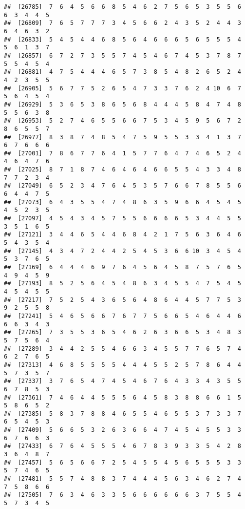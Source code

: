 \documentclass[
]{book}
\begin{document}
\begin{verbatim}
##  [26785]  7  6  4  5  6  6  8  5  4  6  2  7  5  6  5  3  5  5  6  6  3  4  4  5
##  [26809]  7  6  5  7  7  7  3  4  5  6  6  2  4  3  5  2  4  4  3  6  4  6  3  2
##  [26833]  5  4  5  4  4  6  8  5  6  4  6  6  6  5  6  5  5  5  4  5  6  1  3  7
##  [26857]  6  7  2  7  3  5  5  7  4  5  4  6  7  4  5  3  7  8  7  5  5  4  5  4
##  [26881]  4  7  5  4  4  4  6  5  7  3  8  5  4  8  2  6  5  2  4  4  2  3  5  5
##  [26905]  5  6  7  7  5  2  6  5  4  7  3  3  7  6  2  4 10  6  7  5  6  4  5  4
##  [26929]  5  3  6  5  3  8  6  5  6  8  4  4  4  5  8  4  7  4  8  5  5  6  3  8
##  [26953]  5  2  7  4  6  5  5  6  6  7  5  3  4  5  9  5  6  7  2  8  6  5  5  7
##  [26977]  8  3  8  7  4  8  5  4  7  5  9  5  5  3  3  4  1  3  7  6  7  6  6  6
##  [27001]  7  8  6  7  7  6  4  1  5  7  7  6  4  7  4  6  5  2  4  4  6  4  7  6
##  [27025]  8  7  1  8  7  4  6  4  6  4  6  6  5  5  4  3  3  4  8  7  7  2  3  4
##  [27049]  6  5  2  3  4  7  6  4  5  3  5  7  6  6  7  8  5  5  6  6  4  4  7  5
##  [27073]  6  4  3  5  5  4  7  4  8  6  3  5  9  6  6  4  5  4  5  4  5  2  3  5
##  [27097]  4  5  4  3  4  5  7  5  5  6  6  6  6  5  3  4  4  5  5  3  5  1  6  5
##  [27121]  3  4  4  6  5  4  4  6  8  4  2  1  7  5  6  3  6  4  6  5  4  3  5  4
##  [27145]  4  3  4  7  2  4  4  2  5  4  5  3  6  6 10  3  4  5  4  5  3  7  6  5
##  [27169]  6  4  4  4  6  9  7  6  4  5  6  4  5  8  7  5  7  6  5  4  9  4  5  9
##  [27193]  8  5  2  5  6  4  5  4  8  6  3  4  5  5  4  7  5  4  5  4  5  4  5  5
##  [27217]  7  5  2  5  4  3  6  5  6  4  8  6  4  4  5  7  7  5  3  9  2  5  5  8
##  [27241]  5  4  6  5  6  6  7  6  7  7  5  6  6  5  4  6  4  4  6  6  6  3  4  3
##  [27265]  7  3  5  5  3  6  5  4  6  2  6  3  6  6  5  3  4  8  3  5  7  5  6  4
##  [27289]  3  4  4  2  5  5  4  6  6  3  4  5  5  7  7  6  5  7  4  6  2  7  6  5
##  [27313]  4  6  8  5  5  5  5  4  4  4  5  5  2  5  7  8  6  4  4  5  7  3  5  7
##  [27337]  3  7  6  5  4  7  4  5  4  6  7  6  4  3  3  4  3  5  5  6  7  8  5  3
##  [27361]  7  4  6  4  4  5  5  5  6  4  5  8  3  8  8  6  6  1  5  5  8  6  5  2
##  [27385]  5  8  3  7  8  8  4  6  5  5  4  6  5  5  3  7  3  3  7  6  5  4  5  3
##  [27409]  5  6  6  5  3  2  6  3  6  6  4  7  4  5  4  5  5  3  3  6  7  6  6  3
##  [27433]  6  7  6  4  5  5  5  4  6  7  8  3  9  3  3  5  4  2  8  3  6  4  8  7
##  [27457]  5  6  5  6  6  7  2  5  4  5  5  4  5  6  5  5  5  3  3  5  7  4  6  5
##  [27481]  5  5  7  4  8  8  3  7  4  4  4  5  6  3  4  6  2  7  4  7  5  8  6  6
##  [27505]  7  6  3  4  6  3  3  5  6  6  6  6  6  6  3  7  5  5  4  5  7  3  4  5

\end{verbatim}
\end{document}
